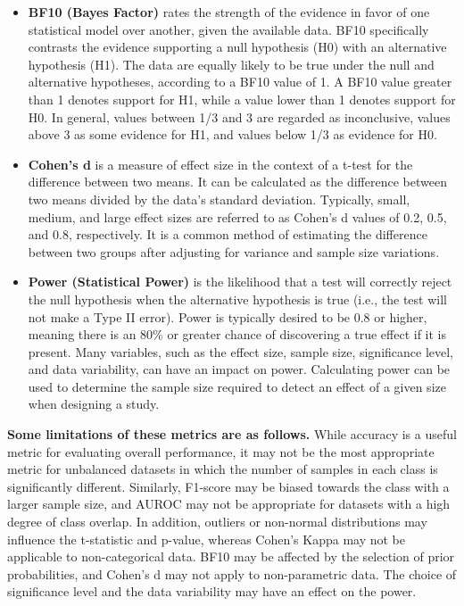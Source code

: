 \begin{itemize}
    \item \textbf{BF10 (Bayes Factor)} rates the strength of the evidence in favor of one statistical model over another, given the available data. BF10 specifically contrasts the evidence supporting a null hypothesis (H0) with an alternative hypothesis (H1). The data are equally likely to be true under the null and alternative hypotheses, according to a BF10 value of 1. A BF10 value greater than 1 denotes support for H1, while a value lower than 1 denotes support for H0. In general, values between 1/3 and 3 are regarded as inconclusive, values above 3 as some evidence for H1, and values below 1/3 as evidence for H0.
    \item \textbf{Cohen's d} is a measure of effect size in the context of a t-test for the difference between two means. It can be calculated as the difference between two means divided by the data's standard deviation. Typically, small, medium, and large effect sizes are referred to as Cohen's d values of 0.2, 0.5, and 0.8, respectively. It is a common method of estimating the difference between two groups after adjusting for variance and sample size variations.
    \item \textbf{Power (Statistical Power)} is the likelihood that a test will correctly reject the null hypothesis when the alternative hypothesis is true (i.e., the test will not make a Type II error). Power is typically desired to be 0.8 or higher, meaning there is an 80\% or greater chance of discovering a true effect if it is present. Many variables, such as the effect size, sample size, significance level, and data variability, can have an impact on power. Calculating power can be used to determine the sample size required to detect an effect of a given size when designing a study.
\end{itemize}

\textbf{Some limitations of these metrics are as follows.}
While accuracy is a useful metric for evaluating overall performance, it may not be the most appropriate metric for unbalanced datasets in which the number of samples in each class is significantly different. Similarly, F1-score may be biased towards the class with a larger sample size, and AUROC may not be appropriate for datasets with a high degree of class overlap. In addition, outliers or non-normal distributions may influence the t-statistic and p-value, whereas Cohen's Kappa may not be applicable to non-categorical data. BF10 may be affected by the selection of prior probabilities, and Cohen's d may not apply to non-parametric data. The choice of significance level and the data variability may have an effect on the power.

